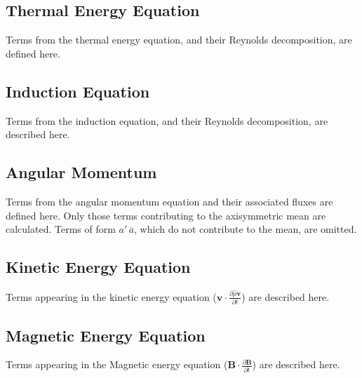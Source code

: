 \documentclass[10pt,letterpaper]{article}
\begin{document}
\subsection{Thermal Energy Equation}
Terms from the thermal energy equation, and their Reynolds decomposition, are defined here.





\subsection{Induction Equation}
Terms from the induction equation, and their Reynolds decomposition, are described here.





\subsection{Angular Momentum}
Terms from the angular momentum equation and their associated fluxes are defined here.  Only those terms contributing to the axisymmetric mean are calculated.  Terms of form $a'\,\overline{a}$, which do not contribute to the mean, are omitted.




\subsection{Kinetic Energy Equation}
Terms appearing in the kinetic energy equation ($\boldsymbol{v}\cdot\frac{\partial \hat{\rho}\boldsymbol{v}}{\partial t}$) are described here.





\subsection{Magnetic Energy Equation}
Terms appearing in the Magnetic energy equation ($\boldsymbol{B}\cdot\frac{\partial \boldsymbol{B}}{\partial t}$) are described here.




\end{document}
